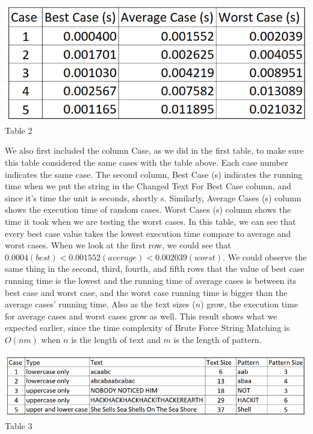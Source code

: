 \documentclass{article}
\begin{document}
\begin{center}
\includegraphics[scale = 0.6]{table2} \\
\scriptsize{Table 2}
\end{center}
\indent We also first included the column Case, as we did in the first table, to make sure this table considered the same cases with the table above. Each case number indicates the same case. The second column, Best Case (s) indicates the running time when we put the string in the Changed Text For Best Case column, and since it's time the unit is seconds, shortly s. Similarly, Average Cases (s) column shows the execution time of random cases. Worst Cases (s) column shows the time it took when we are testing the worst cases. In this table, we can see that every best case value takes the lowest execution time compare to average and worst cases. When we look at the first row, we could see that $0.0004(best) < 0.001552(average) < 0.002039(worst)$. We could observe the same thing in the second, third, fourth, and fifth rows that the value of best case running time is the lowest and the running time of average cases is between its best case and worst case, and the worst case running time is bigger than the average cases' running time. Also as the text sizes ($n$) grow, the execution time for average cases and worst cases grow as well. This result shows what we expected earlier, since the time complexity of Brute Force String Matching is $O(nm)$ when $n$ is the length of text and $m$ is the length of pattern. 

\begin{center}
\includegraphics[scale = 0.5]{table3}\\
\scriptsize{Table 3}
\end{center}
\end{document}
